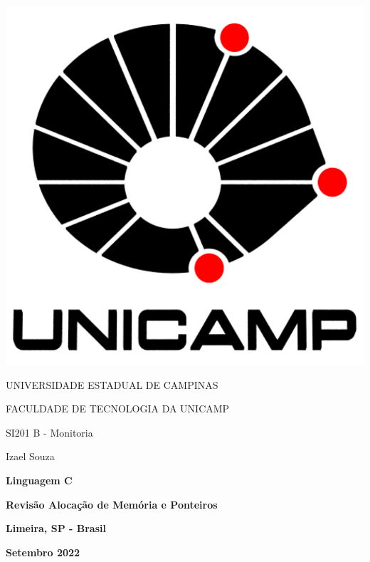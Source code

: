 \thispagestyle{empty}

\noindent\begin{minipage}{0.3\textwidth}
    \includegraphics[scale=0.15]{assets/logo-unicamp.pdf}
\end{minipage}
\hfill
\begin{minipage}{0.6\textwidth}\raggedleft
    UNIVERSIDADE ESTADUAL DE CAMPINAS

    FACULDADE DE TECNOLOGIA DA UNICAMP
    
    SI201 B - Monitoria
    
    Izael Souza
\end{minipage}
\begin{center}
    \hfill%
\end{center}

\begin{center}
    \textbf{\huge Linguagem C}
    
    \hfill
    
    \textbf{\LARGE Revisão Alocação de Memória e Ponteiros}
    
\end{center}

\vspace*{\fill}
\begin{center}
    \textbf{Limeira, SP - Brasil}
    
    \textbf{Setembro 2022}
\end{center}
